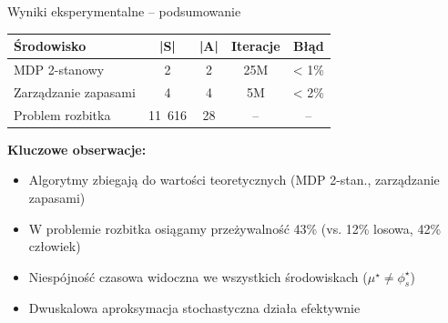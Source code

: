 \begin{frame}{Wyniki eksperymentalne -- podsumowanie}
\begin{table}[h!]
\centering
\small
\begin{tabular}{lcccc}
\toprule
\textbf{Środowisko} & \textbf{|S|} & \textbf{|A|} & \textbf{Iteracje} & \textbf{Błąd} \\
\midrule
MDP 2-stanowy & 2 & 2 & 25M & < 1\% \\
Zarządzanie zapasami & 4 & 4 & 5M & < 2\% \\
Problem rozbitka & 11~616 & 28 & -- & -- \\
\bottomrule
\end{tabular}
\end{table}

\vspace{0.5em}
\textbf{Kluczowe obserwacje:}
\begin{itemize}
    \item Algorytmy zbiegają do wartości teoretycznych (MDP 2-stan., zarządzanie zapasami)
    \item W problemie rozbitka osiągamy przeżywalność 43\% (vs. 12\% losowa, 42\% człowiek)
    \item Niespójność czasowa widoczna we wszystkich środowiskach ($\mu^\star \neq \phi_s^\star$)
    \item Dwuskalowa aproksymacja stochastyczna działa efektywnie
\end{itemize}
\end{frame}

